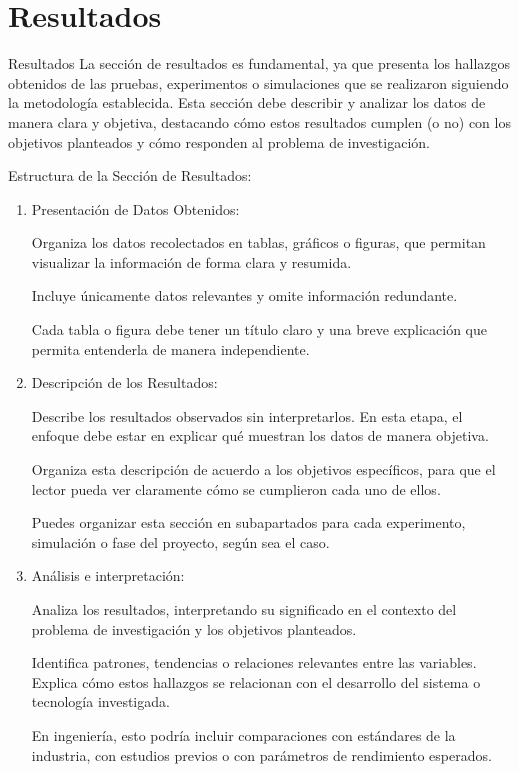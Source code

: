 \documentclass[9pt]{beamer}
\begin{document}
\section{Resultados}
\begin{frame}{Resultados}
La sección de resultados es fundamental, ya que presenta los hallazgos obtenidos de las pruebas, experimentos o simulaciones que se realizaron siguiendo la metodología establecida. Esta sección debe describir y analizar los datos de manera clara y objetiva, destacando cómo estos resultados cumplen (o no) con los objetivos planteados y cómo responden al problema de investigación.

Estructura de la Sección de Resultados:

\begin{enumerate}
    \item Presentación de Datos Obtenidos:

    Organiza los datos recolectados en tablas, gráficos o figuras, que permitan visualizar la información de forma clara y resumida.

    Incluye únicamente datos relevantes y omite información redundante.

    Cada tabla o figura debe tener un título claro y una breve explicación que permita entenderla de manera independiente.

    \item Descripción de los Resultados:

    Describe los resultados observados sin interpretarlos. En esta etapa, el enfoque debe estar en explicar qué muestran los datos de manera objetiva.

    Organiza esta descripción de acuerdo a los objetivos específicos, para que el lector pueda ver claramente cómo se cumplieron cada uno de ellos.

    Puedes organizar esta sección en subapartados para cada experimento, simulación o fase del proyecto, según sea el caso.

    \item Análisis e interpretación:

    Analiza los resultados, interpretando su significado en el contexto del problema de investigación y los objetivos planteados.

    Identifica patrones, tendencias o relaciones relevantes entre las variables. Explica cómo estos hallazgos se relacionan con el desarrollo del sistema o tecnología investigada.

    En ingeniería, esto podría incluir comparaciones con estándares de la industria, con estudios previos o con parámetros de rendimiento esperados.


\end{enumerate}
\end{frame}
\end{document}
